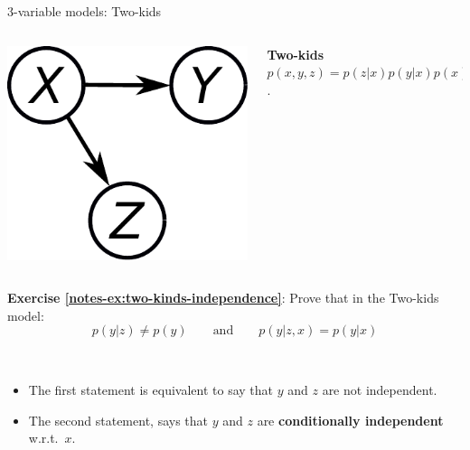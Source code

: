 \documentclass{beamer}
\newcommand{\exercise}[2]{\noindent\colorbox{blue!10}{\parbox{0.995\textwidth}{\textbf{Exercise \ref{notes-ex:#1}}: #2}}\\}
\begin{document}
\begin{frame}{3-variable models: Two-kids}
 \begin{columns}
  \begin{column}{0.12\textwidth}%
   \includegraphics[width=1.2\textwidth]{fig/twokids-xyz.pdf}
  \end{column}%
  \begin{column}{0.8\textwidth}
  \textbf{Two-kids}\;\; $p(x,y,z) = p(z|x)p(y|x)p(x)$.
  \end{column}
 \end{columns}
 \vspace{4mm}
\exercise{two-kinds-independence}{Prove that in the Two-kids model:
\[
 p(y|z)\neq p(y) \qquad \text{and} \qquad  p(y|z,x) =  p(y|x)
\]
}\vspace{2mm}
\begin{itemize}
 \item The first statement is equivalent to say that $y$ and $z$ are not independent.
 \item The second statement, says that $y$ and $z$ are \textbf{conditionally independent} w.r.t.\ $x$.
\end{itemize}
\end{frame}
\end{document}
